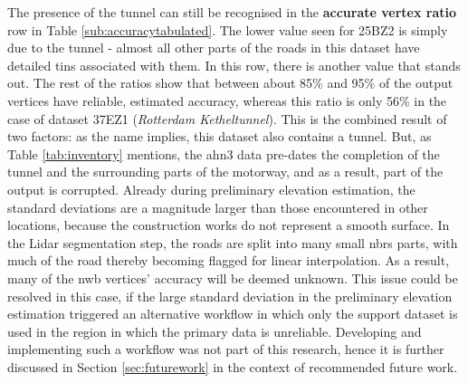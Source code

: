 The presence of the tunnel can still be recognised in the \textbf{accurate vertex ratio} row in Table \ref{sub:accuracytabulated}. The lower value seen for 25BZ2 is simply due to the tunnel - almost all other parts of the roads in this dataset have detailed \ac{tin}s associated with them. In this row, there is another value that stands out. The rest of the ratios show that between about 85\% and 95\% of the output vertices have reliable, estimated accuracy, whereas this ratio is only 56\% in the case of dataset 37EZ1 (\textit{Rotterdam Ketheltunnel}). This is the combined result of two factors: as the name implies, this dataset also contains a tunnel. But, as Table \ref{tab:inventory} mentions, the \ac{ahn3} data pre-dates the completion of the tunnel and the surrounding parts of the motorway, and as a result, part of the output is corrupted. Already during preliminary elevation estimation, the standard deviations are a magnitude larger than those encountered in other locations, because the construction works do not represent a smooth surface. In the Lidar segmentation step, the roads are split into many small \ac{nbrs} parts, with much of the road thereby becoming flagged for linear interpolation. As a result, many of the \ac{nwb} vertices' accuracy will be deemed unknown. This issue could be resolved in this case, if the large standard deviation in the preliminary elevation estimation triggered an alternative workflow in which only the support dataset is used in the region in which the primary data is unreliable. Developing and implementing such a workflow was not part of this research, hence it is further discussed in Section \ref{sec:futurework} in the context of recommended future work.

\begin{table}
    \caption{Tabulated 3D-NWB accuracy and completeness results per testing dataset. Results based on original and densified NWB vertices.}
    \label{tab:accuracytabulated}
\end{table}

